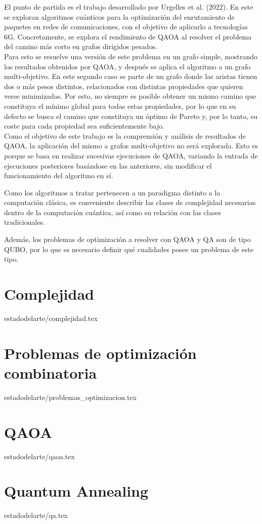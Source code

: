 El punto de partida es el trabajo desarrollado por Urgelles et al. (2022)\cite{multi-objective_routing_optimization}.
En este se exploran algoritmos cuánticos para la optimización del enrutamiento de paquetes en redes de comunicaciones, con el objetivo de aplicarlo a tecnologías 6G.
Concretamente, se explora el rendimiento de QAOA al resolver el problema del camino más corto en grafos dirigidos pesados.
\\
Para esto se resuelve una versión de este problema en un grafo simple, mostrando los resultados obtenidos por QAOA, y después se aplica el algoritmo a un grafo multi-objetivo.
En este segundo caso se parte de un grafo donde las aristas tienen dos o más pesos distintos, relacionados con distintas propiedades que quieren verse minimizadas.
Por esto, no siempre es posible obtener un mismo camino que constituya el mínimo global para todas estas propiedades, por lo que en su defecto se busca el camino que constituya un óptimo de Pareto y, por lo tanto, su coste para cada propiedad sea suficientemente bajo.
\\
Como el objetivo de este trabajo es la comprensión y análisis de resultados de QAOA, la aplicación del mismo a grafos multi-objetivo no será explorada.
Esto es porque se basa en realizar sucesivas ejecuciones de QAOA, variando la entrada de ejecuciones posteriores basándose en las anteriores, sin modificar el funcionamiento del algoritmo en sí.

Como los algoritmos a tratar pertenecen a un paradigma distinto a la computación clásica, es conveniente describir las clases de complejidad necesarias dentro de la computación cuántica, así como su relación con las clases tradicionales.

Además, los problemas de optimización a resolver con QAOA y QA son de tipo QUBO, por lo que es necesario definir qué cualidades posee un problema de este tipo.

\section{Complejidad}{estadodelarte/complejidad.tex}

\section{Problemas de optimización combinatoria\label{sec:2-problemas de optimizacion combinatoria}}{estadodelarte/problemas_optimizacion.tex}

\section{QAOA\label{sec:2-qaoa}}{estadodelarte/qaoa.tex}

\section{Quantum Annealing}{estadodelarte/qa.tex}

